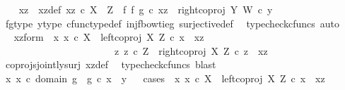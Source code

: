 \begin{isabellebody}
\ \ \isamarkupfalse%
\ xz\ \ xz{\isacharunderscore}{\kern0pt}def{\isacharcolon}{\kern0pt}\ {\isachardoublequoteopen}xz\ {\isasymin}\isactrlsub c\ X\ {\isasymCoprod}\ Z\ {\isasymand}\ {\isacharparenleft}{\kern0pt}f\ {\isasymbowtie}\isactrlsub f\ g{\isacharparenright}{\kern0pt}\ {\isasymcirc}\isactrlsub c\ xz\ {\isacharequal}{\kern0pt}\ right{\isacharunderscore}{\kern0pt}coproj\ Y\ W\ {\isasymcirc}\isactrlsub c\ y{\isachardoublequoteclose}\isanewline
\ \ \ \ \isamarkupfalse%
\ fg{\isacharunderscore}{\kern0pt}type\ y{\isacharunderscore}{\kern0pt}type{}\ cfunc{\isacharunderscore}{\kern0pt}type{\isacharunderscore}{\kern0pt}def\ inj{\isacharunderscore}{\kern0pt}f{\isacharunderscore}{\kern0pt}bowtie{\isacharunderscore}{\kern0pt}g\ surjective{\isacharunderscore}{\kern0pt}def\ \isamarkupfalse%
\ {\isacharparenleft}{\kern0pt}typecheck{\isacharunderscore}{\kern0pt}cfuncs{\isacharcomma}{\kern0pt}\ auto{\isacharparenright}{\kern0pt}\isanewline
\ \ \isamarkupfalse%
\ \isamarkupfalse%
\ xz{\isacharunderscore}{\kern0pt}form{\isacharcolon}{\kern0pt}\ {\isachardoublequoteopen}{\isacharparenleft}{\kern0pt}{\isasymexists}\ x{\isachardot}{\kern0pt}\ x\ {\isasymin}\isactrlsub c\ X\ {\isasymand}\ left{\isacharunderscore}{\kern0pt}coproj\ X\ Z\ {\isasymcirc}\isactrlsub c\ x\ {\isacharequal}{\kern0pt}\ xz{\isacharparenright}{\kern0pt}\ {\isasymor}\ \ \isanewline
\ \ \ \ \ \ \ \ \ \ \ \ \ \ \ \ \ \ \ \ \ \ {\isacharparenleft}{\kern0pt}{\isasymexists}\ z{\isachardot}{\kern0pt}\ z\ {\isasymin}\isactrlsub c\ Z\ {\isasymand}\ right{\isacharunderscore}{\kern0pt}coproj\ X\ Z\ {\isasymcirc}\isactrlsub c\ z\ {\isacharequal}{\kern0pt}\ xz{\isacharparenright}{\kern0pt}{\isachardoublequoteclose}\isanewline
\ \ \ \ \isamarkupfalse%
\ coprojs{\isacharunderscore}{\kern0pt}jointly{\isacharunderscore}{\kern0pt}surj\ xz{\isacharunderscore}{\kern0pt}def\ \isamarkupfalse%
\ {\isacharparenleft}{\kern0pt}typecheck{\isacharunderscore}{\kern0pt}cfuncs{\isacharcomma}{\kern0pt}\ blast{\isacharparenright}{\kern0pt}\isanewline
\ \ \isamarkupfalse%
\ {\isachardoublequoteopen}{\isasymexists}x{\isachardot}{\kern0pt}\ x\ {\isasymin}\isactrlsub c\ domain\ g\ {\isasymand}\ g\ {\isasymcirc}\isactrlsub c\ x\ {\isacharequal}{\kern0pt}\ y{\isachardoublequoteclose}\isanewline
\ \ \isamarkupfalse%
{\isacharparenleft}{\kern0pt}cases\ {\isachardoublequoteopen}{\isasymexists}\ x{\isachardot}{\kern0pt}\ x\ {\isasymin}\isactrlsub c\ X\ {\isasymand}\ left{\isacharunderscore}{\kern0pt}coproj\ X\ Z\ {\isasymcirc}\isactrlsub c\ x\ {\isacharequal}{\kern0pt}\ xz{\isachardoublequoteclose}{\isacharparenright}{\kern0pt}\isanewline

\end{isabellebody}

